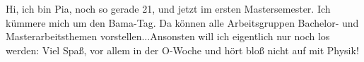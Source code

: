 \begin{multicols*}{2}
{Hi, ich bin Pia, noch so gerade 21, und jetzt im ersten Mastersemester. Ich kümmere mich um den Bama-Tag. Da können alle Arbeitsgruppen Bachelor- und Masterarbeitsthemen vorstellen...Ansonsten will ich eigentlich nur noch los werden:
	Viel Spaß, vor allem in der O-Woche und hört bloß nicht auf mit Physik!
}


\end{multicols*}
